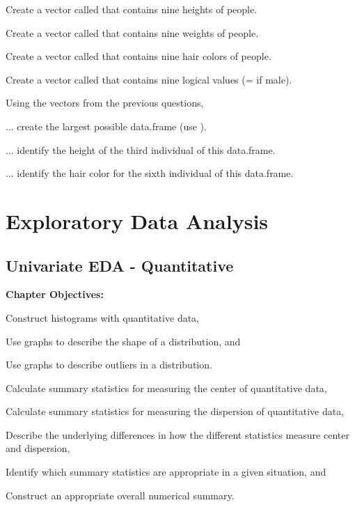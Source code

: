 \documentclass[10pt,openany]{book}\usepackage[]{graphicx}\usepackage[]{color}
\begin{document}
\begin{exsection}
  \item \label{revex:BasicsData1}\rhw{} Create a vector called  that contains nine heights of people. 
  \item \label{revex:BasicsData2}\rhw{} Create a vector called  that contains nine weights of people. 
  \item \label{revex:BasicsData3}\rhw{} Create a vector called  that contains nine hair colors of people. 
  \item \label{revex:BasicsData4}\rhw{} Create a vector called  that contains nine logical values (= if male). 
  \item \label{revex:BasicsData5}\rhw{} Using the vectors from the previous questions,  
  \begin{Enumerate}
    \item ... create the largest possible data.frame (use ).
    \item ... identify the height of the third individual of this data.frame.
    \item ... identify the hair color for the sixth individual of this data.frame.
  \end{Enumerate}
\end{exsection}

    \part{Exploratory Data Analysis}



\chapter{Univariate EDA - Quantitative} \label{chap:UnivEDAQuant}
\begin{ChapObj}{\boxwidth}
  \textbf{Chapter Objectives:}
  \begin{Enumerate}
    \item Construct histograms with quantitative data,
    \item Use graphs to describe the shape of a distribution, and
    \item Use graphs to describe outliers in a distribution.
    \item Calculate summary statistics for measuring the center of quantitative data,
    \item Calculate summary statistics for measuring the dispersion of quantitative data,
    \item Describe the underlying differences in how the different statistics measure center and dispersion,
    \item Identify which summary statistics are appropriate in a given situation, and
    \item Construct an appropriate overall numerical summary.
  \end{Enumerate}
\end{ChapObj}
\end{document}
